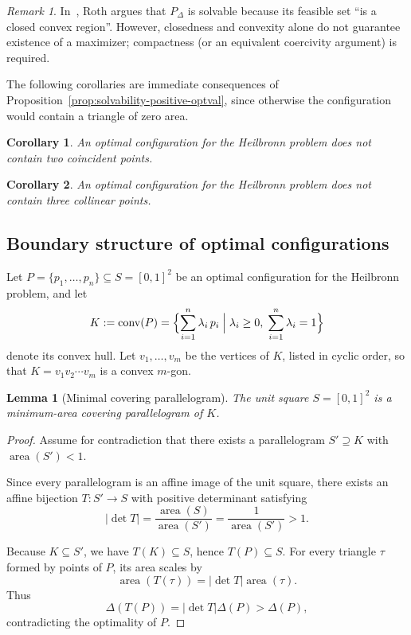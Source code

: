 \documentclass[11pt,a4paper]{article}
\theoremstyle{plain}
\newtheorem{lemma}{Lemma}
\newtheorem{corollary}{Corollary}
\theoremstyle{definition}
\theoremstyle{remark}
\newtheorem{remark}{Remark}
\begin{document}
  \begin{remark}
  In~\cite{Roth1951}, Roth argues that $P_\Delta$ is solvable because its feasible set \enquote{is a closed convex region}. 
  However, closedness and convexity alone do not guarantee existence of a maximizer; compactness (or an equivalent coercivity argument) is required.
  \end{remark}
  
  The following corollaries are immediate consequences of Proposition~\ref{prop:solvability-positive-optval}, since otherwise the configuration would contain a triangle of zero area.

  \begin{corollary}
  An optimal configuration for the Heilbronn problem does not contain two coincident points.
  \end{corollary}
  
  \begin{corollary}
  An optimal configuration for the Heilbronn problem does not contain three collinear points.
  \end{corollary}

\subsection{Boundary structure of optimal configurations}\label{sec: boundary configuration}

Let $P=\{p_1,\dots,p_n\}\subseteq S=[0,1]^2$ be an optimal configuration
for the Heilbronn problem, and let
\[
K := \operatorname{conv}(P)
= \Bigl\{\sum_{i=1}^{n}\lambda_i\, p_i \;\Big|\; \lambda_i\ge 0,\;\sum_{i=1}^{n}\lambda_i=1\Bigr\}
\]
denote its convex hull.
Let $v_1,\dots,v_m$ be the vertices of $K$, listed in cyclic order,
so that $K = v_1 v_2 \cdots v_m$ is a convex $m$-gon.

\begin{lemma}[Minimal covering parallelogram]\label{lem:min_parallelogram}
The unit square $S=[0,1]^2$ is a minimum-area covering parallelogram of $K$.
\end{lemma}

\begin{proof}
Assume for contradiction that there exists a parallelogram $S' \supseteq K$
with $\operatorname{area}(S') < 1$.

Since every parallelogram is an affine image of the unit square,
there exists an affine bijection $T: S' \to S$
with positive determinant satisfying
\[
|\det T| = \frac{\operatorname{area}(S)}{\operatorname{area}(S')}
= \frac{1}{\operatorname{area}(S')} > 1.
\]

Because $K \subseteq S'$, we have $T(K) \subseteq S$, hence $T(P) \subseteq S$.
For every triangle $\tau$ formed by points of $P$,
its area scales by
\[
\operatorname{area}(T(\tau))
= |\det T| \operatorname{area}(\tau).
\]
Thus
\[
\Delta(T(P))
= |\det T| \Delta(P)
> \Delta(P),
\]
contradicting the optimality of $P$.
\end{proof}
\end{document}
